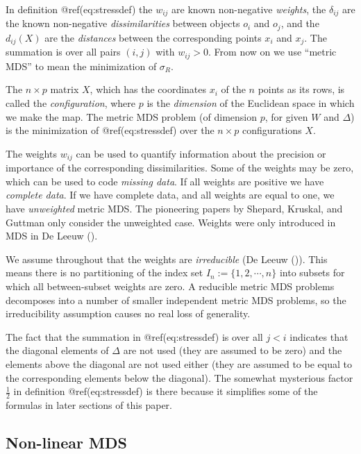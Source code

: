 \documentclass[
  12pt,
  letterpaper,
  DIV=11,
  numbers=noendperiod]{scrartcl}
\theoremstyle{plain}
\theoremstyle{remark}
\begin{document}
In definition @ref(eq:stressdef) the \(w_{ij}\) are known non-negative
\emph{weights}, the \(\delta_{ij}\) are the known non-negative
\emph{dissimilarities} between objects \(o_i\) and \(o_j\), and the
\(d_{ij}(X)\) are the \emph{distances} between the corresponding points
\(x_i\) and \(x_j\). The summation is over all pairs \((i,j)\) with
\(w_{ij}>0\). From now on we use ``metric MDS'' to mean the minimization
of \(\sigma_R\).

The \(n\times p\) matrix \(X\), which has the coordinates \(x_i\) of the
\(n\) points as its rows, is called the \emph{configuration}, where
\(p\) is the \emph{dimension} of the Euclidean space in which we make
the map. The metric MDS problem (of dimension \(p\), for given \(W\) and
\(\Delta\)) is the minimization of @ref(eq:stressdef) over the
\(n\times p\) configurations \(X\).

The weights \(w_{ij}\) can be used to quantify information about the
precision or importance of the corresponding dissimilarities. Some of
the weights may be zero, which can be used to code \emph{missing data}.
If all weights are positive we have \emph{complete data}. If we have
complete data, and all weights are equal to one, we have
\emph{unweighted} metric MDS. The pioneering papers by Shepard, Kruskal,
and Guttman only consider the unweighted case. Weights were only
introduced in MDS in De Leeuw ().

We assume throughout that the weights are \emph{irreducible} (De Leeuw
()). This means there is no
partitioning of the index set \(I_n:=\{1,2,\cdots,n\}\) into subsets for
which all between-subset weights are zero. A reducible metric MDS
problems decomposes into a number of smaller independent metric MDS
problems, so the irreducibility assumption causes no real loss of
generality.

The fact that the summation in @ref(eq:stressdef) is over all \(j<i\)
indicates that the diagonal elements of \(\Delta\) are not used (they
are assumed to be zero) and the elements above the diagonal are not used
either (they are assumed to be equal to the corresponding elements below
the diagonal). The somewhat mysterious factor \(\frac12\) in definition
@ref(eq:stressdef) is there because it simplifies some of the formulas
in later sections of this paper.

\subsection{Non-linear MDS}\label{non-linear-mds}
\end{document}
